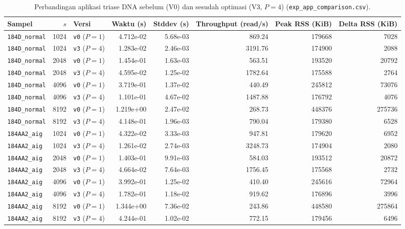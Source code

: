 \documentclass[11pt,a4paper]{article}
\begin{document}
\begin{table}[H]
\centering
\caption{Perbandingan aplikasi triase DNA sebelum (V0) dan sesudah optimasi (V3, $P=4$) (\texttt{exp\_app\_comparison.csv}).}
\label{tab:app}
\begin{tabular}{lrlrrrrr}
\toprule
\textbf{Sampel} & \textbf{$s$} & \textbf{Versi} & \textbf{Waktu (s)} & \textbf{Stddev (s)} & \textbf{Throughput (read/s)} & \textbf{Peak RSS (KiB)} & \textbf{Delta RSS (KiB)} \\
\midrule
\texttt{184D\_normal} & 1024 & \texttt{v0} ($P=1$) & 4.712e-02 & 5.68e-03 & 869.24 & 179668 & 7028 \\
\texttt{184D\_normal} & 1024 & \texttt{v3} ($P=4$) & 1.283e-02 & 2.46e-03 & 3191.76 & 174900 & 2088 \\
\texttt{184D\_normal} & 2048 & \texttt{v0} ($P=1$) & 1.454e-01 & 1.63e-03 & 563.51 & 193520 & 20792 \\
\texttt{184D\_normal} & 2048 & \texttt{v3} ($P=4$) & 4.595e-02 & 1.25e-02 & 1782.64 & 175588 & 2764 \\
\texttt{184D\_normal} & 4096 & \texttt{v0} ($P=1$) & 3.719e-01 & 1.37e-02 & 440.49 & 245812 & 73076 \\
\texttt{184D\_normal} & 4096 & \texttt{v3} ($P=4$) & 1.101e-01 & 4.67e-02 & 1487.88 & 176792 & 4076 \\
\texttt{184D\_normal} & 8192 & \texttt{v0} ($P=1$) & 1.219e+00 & 2.47e-02 & 268.73 & 448376 & 275736 \\
\texttt{184D\_normal} & 8192 & \texttt{v3} ($P=4$) & 4.148e-01 & 1.96e-03 & 790.04 & 179380 & 6528 \\
\midrule
\texttt{184AA2\_aig} & 1024 & \texttt{v0} ($P=1$) & 4.322e-02 & 3.33e-03 & 947.81 & 179620 & 6952 \\
\texttt{184AA2\_aig} & 1024 & \texttt{v3} ($P=4$) & 1.261e-02 & 2.74e-03 & 3248.73 & 174904 & 2080 \\
\texttt{184AA2\_aig} & 2048 & \texttt{v0} ($P=1$) & 1.403e-01 & 9.91e-03 & 584.03 & 193512 & 20872 \\
\texttt{184AA2\_aig} & 2048 & \texttt{v3} ($P=4$) & 4.664e-02 & 7.64e-03 & 1756.45 & 175568 & 2732 \\
\texttt{184AA2\_aig} & 4096 & \texttt{v0} ($P=1$) & 3.992e-01 & 1.25e-02 & 410.40 & 245616 & 72964 \\
\texttt{184AA2\_aig} & 4096 & \texttt{v3} ($P=4$) & 1.782e-01 & 1.18e-02 & 919.62 & 176896 & 3996 \\
\texttt{184AA2\_aig} & 8192 & \texttt{v0} ($P=1$) & 1.344e+00 & 7.36e-02 & 243.86 & 448580 & 275864 \\
\texttt{184AA2\_aig} & 8192 & \texttt{v3} ($P=4$) & 4.244e-01 & 1.02e-02 & 772.15 & 179456 & 6496 \\
\bottomrule
\end{tabular}
\end{table}
\end{document}
